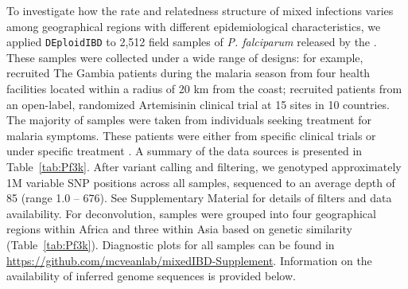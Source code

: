 \documentclass[9pt,lineno]{elife}
\begin{document}
To investigate how the rate and relatedness structure of mixed infections varies among geographical regions with different epidemiological characteristics, we applied \texttt{DEploidIBD} to 2,512 field samples of {\it P. falciparum} released by the \citet{pf3k}.  These samples were collected under a wide range of designs: for example, \citet{Amambua-Ngwa2012} recruited The Gambia patients during the malaria season from four health facilities located within a radius of 20 km from the coast; \citet{Ashley2014} recruited patients from an open-label, randomized Artemisinin clinical trial at 15 sites in 10 countries. The majority of samples were taken from individuals seeking treatment for malaria symptoms. These patients were either from specific clinical trials \citep{Ocholla2014} or under specific treatment \citep{Duffy2015, Miotto2013, eLife2016}.  A summary of the data sources is presented in Table~\ref{tab:Pf3k}.  After variant calling and filtering, we genotyped approximately 1M variable SNP positions across all samples, sequenced to an average depth of 85 (range 1.0 – 676).  See Supplementary Material for details of filters and data availability.  For deconvolution, samples were grouped into four geographical regions within Africa and three within Asia based on genetic similarity (Table~\ref{tab:Pf3k}).  Diagnostic plots for all samples can be found in \url{https://github.com/mcveanlab/mixedIBD-Supplement}.  Information on the availability of inferred genome sequences is provided below.
\end{document}
